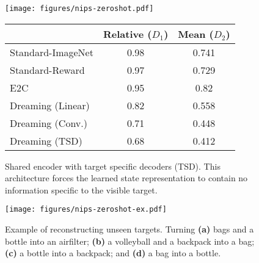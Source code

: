 \documentclass[letterpaper, 10 pt, conference]{ieeeconf}
\begin{document}


\begin{figure*}
    \centering
    \begin{minipage}{0.5\textwidth}
    \centering
      \texttt{[image: figures/nips-zeroshot.pdf]}
      \caption{Shared encoder with target specific decoders (TSD). This architecture forces the learned state representation to contain no information specific to the visible target.}
      \label{fig:zeroshot-model}
    \end{minipage}
    \hfill
    \begin{minipage}{0.48\textwidth}
      \label{tab:norml1}
      \centering
      \small
      \begin{tabular}{lcc}
        \toprule
             &  Relative ($D_1$)    & Mean ($D_2$) \\
        \midrule
         Standard-ImageNet &	0.98 &	0.741\\
         Standard-Reward &	0.97 &	0.729\\
         E2C \cite{watter2015embed} & 0.95 & 0.82\\
         Dreaming (Linear) &	0.82 &	0.558\\
         Dreaming (Conv.) &	0.71 &	0.448\\
         Dreaming (TSD)         & 0.68  & 0.412\\
        \bottomrule
       \end{tabular}
    \end{minipage}
\end{figure*}

\begin{figure}
    \centering
      \texttt{[image: figures/nips-zeroshot-ex.pdf]}
      \caption{Example of reconstructing unseen targets. Turning \textbf{(a)} bags and a bottle into an airfilter; \textbf{(b)} a volleyball and a backpack into a bag; \textbf{(c)} a bottle into a backpack; and \textbf{(d)} a bag into a bottle.}
      \label{fig:zeroshot-example}
\end{figure}
\end{document}
